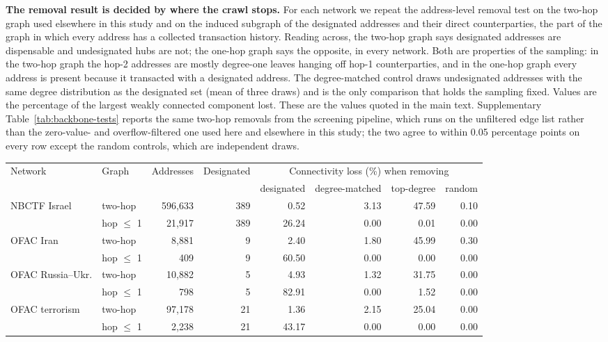 \caption{\textbf{The removal result is decided by where the crawl stops.} For each network we repeat the address-level removal test on the two-hop graph used elsewhere in this study and on the induced subgraph of the designated addresses and their direct counterparties, the part of the graph in which every address has a collected transaction history. Reading across, the two-hop graph says designated addresses are dispensable and undesignated hubs are not; the one-hop graph says the opposite, in every network. Both are properties of the sampling: in the two-hop graph the hop-2 addresses are mostly degree-one leaves hanging off hop-1 counterparties, and in the one-hop graph every address is present because it transacted with a designated address. The degree-matched control draws undesignated addresses with the same degree distribution as the designated set (mean of three draws) and is the only comparison that holds the sampling fixed. Values are the percentage of the largest weakly connected component lost. These are the values quoted in the main text. Supplementary Table~\ref{tab:backbone-tests} reports the same two-hop removals from the screening pipeline, which runs on the unfiltered edge list rather than the zero-value- and overflow-filtered one used here and elsewhere in this study; the two agree to within 0.05 percentage points on every row except the random controls, which are independent draws.}
\label{tab:boundary}
\scriptsize
\setlength{\tabcolsep}{4pt}
\begin{tabular}{llrrrrrr}
\toprule
Network & Graph & Addresses & Designated & \multicolumn{4}{c}{Connectivity loss (\%) when removing} \\
\cmidrule(lr){5-8}
 & & & & designated & degree-matched & top-degree & random \\
\midrule
NBCTF Israel & two-hop & 596,633 & 389 & 0.52 & 3.13 & 47.59 & 0.10 \\
 & hop $\leq$ 1 & 21,917 & 389 & 26.24 & 0.00 & 0.01 & 0.00 \\
\addlinespace
OFAC Iran & two-hop & 8,881 & 9 & 2.40 & 1.80 & 45.99 & 0.30 \\
 & hop $\leq$ 1 & 409 & 9 & 60.50 & 0.00 & 0.00 & 0.00 \\
\addlinespace
OFAC Russia--Ukr. & two-hop & 10,882 & 5 & 4.93 & 1.32 & 31.75 & 0.00 \\
 & hop $\leq$ 1 & 798 & 5 & 82.91 & 0.00 & 1.52 & 0.00 \\
\addlinespace
OFAC terrorism & two-hop & 97,178 & 21 & 1.36 & 2.15 & 25.04 & 0.00 \\
 & hop $\leq$ 1 & 2,238 & 21 & 43.17 & 0.00 & 0.00 & 0.00 \\
\bottomrule
\end{tabular}
